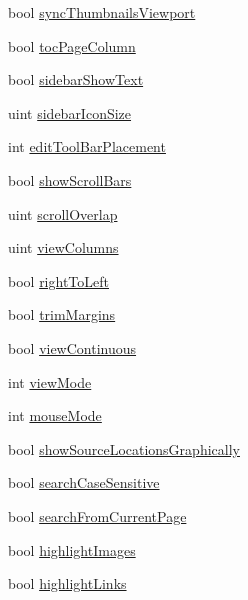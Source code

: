 \begin{DoxyCompactItemize}
bool \hyperlink{classOkular_1_1SettingsPrivate_a567633dcf70a6083fde5ef44fdbe2686}{sync\+Thumbnails\+Viewport}
\item 
bool \hyperlink{classOkular_1_1SettingsPrivate_a61bcaf2845f9e0d30cb834d25a96394a}{toc\+Page\+Column}
\item 
bool \hyperlink{classOkular_1_1SettingsPrivate_aa08cf64b458c6e54684a87ca6705501c}{sidebar\+Show\+Text}
\item 
uint \hyperlink{classOkular_1_1SettingsPrivate_aaf8c234fb36d75db4b97f0f46f0828b7}{sidebar\+Icon\+Size}
\item 
int \hyperlink{classOkular_1_1SettingsPrivate_a007a9a6e82a2d2dbd373c072a6aecce6}{edit\+Tool\+Bar\+Placement}
\item 
bool \hyperlink{classOkular_1_1SettingsPrivate_a9d05cb4daab39a953cbd862bff2fe47c}{show\+Scroll\+Bars}
\item 
uint \hyperlink{classOkular_1_1SettingsPrivate_af3c41a275314a6a6e94bfb4bb9bde572}{scroll\+Overlap}
\item 
uint \hyperlink{classOkular_1_1SettingsPrivate_ad8904e535922fef778bc8b83639607d5}{view\+Columns}
\item 
bool \hyperlink{classOkular_1_1SettingsPrivate_ae3b7277848df4610de3f8a05d737cbf8}{right\+To\+Left}
\item 
bool \hyperlink{classOkular_1_1SettingsPrivate_a4f646d665119edc0a8aafc58897816f0}{trim\+Margins}
\item 
bool \hyperlink{classOkular_1_1SettingsPrivate_a105c4b8f8abe6b4543168f0cdc9629d2}{view\+Continuous}
\item 
int \hyperlink{classOkular_1_1SettingsPrivate_a1676716efb0c771777fbcdfc66800e11}{view\+Mode}
\item 
int \hyperlink{classOkular_1_1SettingsPrivate_a38b266f564e758f5a0634b3e56f4d7d6}{mouse\+Mode}
\item 
bool \hyperlink{classOkular_1_1SettingsPrivate_af23f52eb1e6c8cf84cbbe9683b9866ed}{show\+Source\+Locations\+Graphically}
\item 
bool \hyperlink{classOkular_1_1SettingsPrivate_a8efa1f3ff95b35de3918e7d50c65af13}{search\+Case\+Sensitive}
\item 
bool \hyperlink{classOkular_1_1SettingsPrivate_a79e1f0ced04bb9073d77c1e442aebc8f}{search\+From\+Current\+Page}
\item 
bool \hyperlink{classOkular_1_1SettingsPrivate_a9c5e6321acc2783dc74d13e212949f06}{highlight\+Images}
\item 
bool \hyperlink{classOkular_1_1SettingsPrivate_a60cd257eee44d96f790c173d05b187b8}{highlight\+Links}

\end{DoxyCompactItemize}
